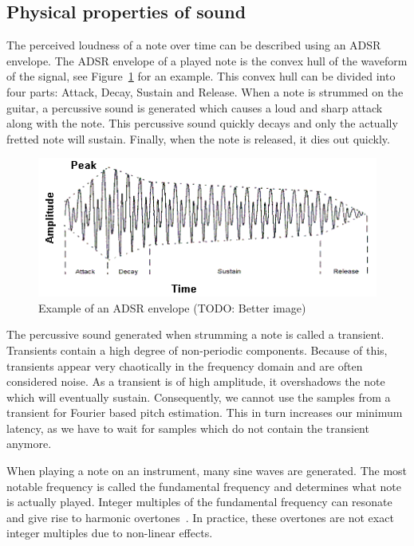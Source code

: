 \documentclass[10pt,twocolumn]{article}
\begin{document}
\subsection{Physical properties of sound}  \label{sec:physsound}
The perceived loudness of a note over time can be described using an ADSR envelope. The ADSR envelope of a played note is the convex hull of the waveform of the signal, see Figure~\ref{fig:adsr} for an example. This convex hull can be divided into four parts: Attack, Decay, Sustain and Release. When a note is strummed on the guitar, a percussive sound is generated which causes a loud and sharp attack along with the note. This percussive sound quickly decays and only the actually fretted note will sustain. Finally, when the note is released, it dies out quickly.
\begin{figure}[H]
    \centering
    \includegraphics[width=\linewidth]{fig/envelope.png}
    \caption{Example of an ADSR envelope (TODO: Better image)}
    \label{fig:adsr}
\end{figure}

The percussive sound generated when strumming a note is called a transient. Transients contain a high degree of non-periodic components. Because of this, transients appear very chaotically in the frequency domain and are often considered noise. As a transient is of high amplitude, it overshadows the note which will eventually sustain. Consequently, we cannot use the samples from a transient for Fourier based pitch estimation. This in turn increases our minimum latency, as we have to wait for samples which do not contain the transient anymore.

When playing a note on an instrument, many sine waves are generated. The most notable frequency is called the fundamental frequency and determines what note is actually played. Integer multiples of the fundamental frequency can resonate and give rise to harmonic overtones~\cite{overtones}. In practice, these overtones are not exact integer multiples due to non-linear effects.
\end{document}
